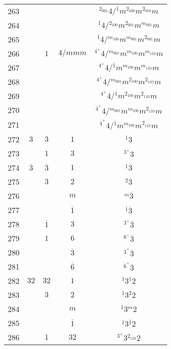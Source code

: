 \begin{longtable}{ccccc}
  263 &  &  &  & ${}^{2_{001}} 4  / {}^{\overline{1}} m {}^{2_{100}} m {}^{2_{010}} m $\\
  264 &  &  &  & ${}^{\overline{1}} 4  / {}^{2_{100}} m {}^{2_{001}} m {}^{m_{001}} m $\\
  265 &  &  &  & ${}^{\overline{1}} 4  / {}^{m_{100}} m {}^{m_{001}} m {}^{2_{001}} m $\\
  266 &  & $1$ & $4/mmm$ & ${}^{4^{+}} 4  / {}^{m_{001}} m {}^{m_{100}} m {}^{m_{1\overline{1}0}} m $\\
  267 &  &  &  & ${}^{4^{+}} 4  / {}^{\overline{1}} m {}^{m_{100}} m {}^{m_{1\overline{1}0}} m $\\
  268 &  &  &  & ${}^{4^{+}} 4  / {}^{m_{001}} m {}^{2_{100}} m {}^{2_{1\overline{1}0}} m $\\
  269 &  &  &  & ${}^{4^{+}} 4  / {}^{\overline{1}} m {}^{2_{100}} m {}^{2_{1\overline{1}0}} m $\\
  270 &  &  &  & ${}^{\overline{4}^{+}} 4  / {}^{m_{001}} m {}^{m_{100}} m {}^{2_{1\overline{1}0}} m $\\
  271 &  &  &  & ${}^{\overline{4}^{+}} 4  / {}^{\overline{1}} m {}^{m_{100}} m {}^{2_{1\overline{1}0}} m $\\
  272 & $3$ & $3$ & $1$ & ${}^{1} 3 $\\
  273 &  & $1$ & $3$ & ${}^{3^{+}} 3 $\\
  274 & $\overline{3}$ & $\overline{3}$ & $1$ & ${}^{1} \overline{3} $\\
  275 &  & $3$ & $2$ & ${}^{2} \overline{3} $\\
  276 &  &  & $m$ & ${}^{m} \overline{3} $\\
  277 &  &  & $\overline{1}$ & ${}^{\overline{1}} \overline{3} $\\
  278 &  & $\overline{1}$ & $3$ & ${}^{3^{+}} \overline{3} $\\
  279 &  & $1$ & $6$ & ${}^{6^{+}} \overline{3} $\\
  280 &  &  & $\overline{3}$ & ${}^{\overline{3}^{+}} \overline{3} $\\
  281 &  &  & $\overline{6}$ & ${}^{\overline{6}^{+}} \overline{3} $\\
  282 & $32$ & $32$ & $1$ & ${}^{1} 3 {}^{1} 2 $\\
  283 &  & $3$ & $2$ & ${}^{1} 3 {}^{2} 2 $\\
  284 &  &  & $m$ & ${}^{1} 3 {}^{m} 2 $\\
  285 &  &  & $\overline{1}$ & ${}^{1} 3 {}^{\overline{1}} 2 $\\
  286 &  & $1$ & $32$ & ${}^{3^{+}} 3 {}^{2_{1\overline{1}0}} 2 $\\

\end{longtable}
